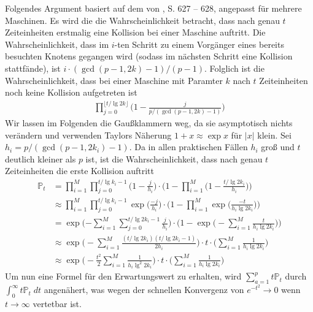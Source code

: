 \documentclass[a4paper, 10pt, ngerman]{article}
\begin{document}
Folgendes Argument basiert auf dem von \cite{bp81}, S. 627 -- 628, angepasst für mehrere Maschinen. Es wird die die Wahrscheinlichkeit betracht, dass nach genau $t$ Zeiteinheiten erstmalig eine Kollision bei einer Maschine auftritt. Die Wahrscheinlichkeit, dass im $i$-ten Schritt zu einem Vorgänger eines bereits besuchten Knotens gegangen wird (sodass im nächsten Schritt eine Kollision stattfände), ist $i \cdot (\gcd(p - 1, 2k) - 1)/(p - 1)$. Folglich ist die Wahrscheinlichkeit, dass bei einer Maschine mit Paramter $k$ nach $t$ Zeiteinheiten noch keine Kollision aufgetreten ist
\begin{align*}
    \prod_{j = 0}^{\lfloor t / \lg 2k \rfloor} \bigg (1 - \frac {j} {p / (\gcd(p - 1, 2k) - 1)} \bigg )
\end{align*}
Wir lassen im Folgenden die Gaußklammern weg, da sie asymptotisch nichts verändern und verwenden Taylors Näherung $1 + x \approx \exp x$ für $|x|$ klein. Sei $h_i = p / (\gcd(p - 1, 2k_i) - 1)$. Da in allen praktischen Fällen $h_i$ groß und $t$ deutlich kleiner als $p$ ist, ist die Wahrscheinlichkeit, dass nach genau $t$ Zeiteinheiten die erste Kollision auftritt
\begin{align*}
    \mathbb{P}_t
     & = \prod_{i = 1}^M \prod_{j = 0}^{t / \lg k_i - 1}
    \Bigg (1 - \frac {j} {h_i} \Bigg ) \cdot \Bigg (1 - \prod_{i = 1}^M \Bigg (1 - \frac {t / \lg 2k_i} {h_i} \Bigg ) \Bigg )                                                            \\
     & \approx \prod_{i = 1}^M \prod_{j = 0}^{t / \lg k_i - 1} \exp \Bigg ( \frac {-j}{h_i} \Bigg ) \cdot \Bigg (1 - \prod_{i = 1}^M \exp \Bigg (\frac {-t}{h_i \lg 2k_i} \Bigg )\Bigg ) \\
     & = \exp \Bigg ({- \sum_{i = 1}^M \sum_{j = 0}^{t/\lg 2k_i - 1} \frac j {h_i}} \Bigg ) \cdot \Bigg (1 - \exp \Bigg ( -\sum_{i = 1}^M \frac t {h_i \lg 2k_i} \Bigg ) \Bigg )         \\
     & \approx \exp \Bigg (- \sum_{i = 1}^M \frac {(t/\lg 2k_i)(t/\lg 2k_i - 1)} {2h_i} \Bigg ) \cdot t \cdot \Bigg (\sum_{i = 1}^M \frac 1 {h_i \lg 2k_i} \Bigg )                       \\
     & \approx \exp \Bigg (- \frac {t^2} 2 \sum_{i = 1}^M \frac 1 {h_i \lg^2 2k_i} \Bigg ) \cdot t \cdot \Bigg (\sum_{i = 1}^M \frac 1 {h_i \lg 2k_i} \Bigg )
\end{align*}
Um nun eine Formel für den Erwartungswert zu erhalten, wird $\sum_{a = 1}^p t \mathbb{P}_t$ durch $\int_{0}^\infty t \mathbb{P}_t \; dt$ angenähert, was wegen der schnellen Konvergenz von $e^{-t^2} \to 0$ wenn $t \to \infty$ vertetbar ist.
\end{document}
